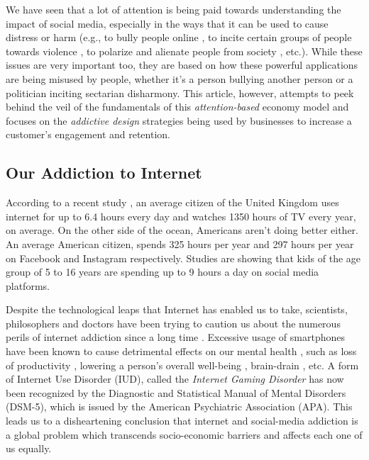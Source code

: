 \documentclass[conference]{IEEEtran}
\begin{document}
We have seen that a lot of attention is being paid towards understanding the impact of social media, especially in the ways that it can be used to cause distress or harm (e.g., to bully people online \cite{campbell2005}, to incite certain groups of people towards violence \cite{huey2015}, to polarize and alienate people from society \cite{sunstein2017}, etc.). While these issues are very important too, they are based on how these powerful applications are being misused by people, whether it's a person bullying another person or a politician inciting sectarian disharmony. This article, however, attempts to peek behind the veil of the fundamentals of this {\it attention-based} economy model and focuses on the {\it addictive design} strategies being used by businesses to increase a customer's engagement and retention.

\subsection{Our Addiction to Internet}
According to a recent study \cite{uswitch2021}, an average citizen of the United Kingdom uses internet for up to 6.4 hours every day and watches 1350 hours of TV every year, on average. On the other side of the ocean, Americans aren't doing better either. An average American citizen, spends 325 hours per year and 297 hours per year on Facebook and Instagram respectively. Studies are showing that kids of the age group of 5 to 16 years are spending up to 9 hours a day on social media platforms. 

Despite the technological leaps that Internet has enabled us to take, scientists, philosophers and doctors have been trying to caution us about the numerous perils of internet addiction since a long time \cite{th1996, gr1998}. Excessive usage of smartphones have been known to cause detrimental effects on our mental health \cite{sc2018}, such as loss of productivity \cite{duke2017}, lowering a person's overall well-being \cite{twenge2018}, brain-drain \cite{ward2017}, etc. A form of Internet Use Disorder (IUD), called the {\it Internet Gaming Disorder} has now been recognized \cite{pontes19} by the Diagnostic and Statistical Manual of Mental Disorders (DSM-5), which is issued by the American Psychiatric Association (APA). This leads us to a disheartening conclusion that internet and social-media addiction is a global problem which transcends socio-economic barriers and affects each one of us equally.
\end{document}
